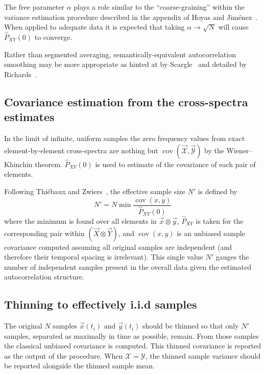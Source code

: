 \documentclass[letterpaper,11pt,nointlimits,reqno]{amsart}
\DeclareMathOperator{\cov}{cov}
\begin{document}
The free parameter $\alpha$ plays a role similar to the ``coarse-graining''
within the variance estimation procedure described in the appendix of Hoyas and
Jim\'{e}nez~\cite{Hoyas2008Reynolds}.  When applied to adequate data it is
expected that taking $\alpha\to\sqrt{N}$ will cause $\hat{P}_{XY}(0)$ to
converge.

Rather than segmented averaging, semantically-equivalent autocorrelation
smoothing may be more appropriate as hinted at by
Scargle~\cite{Scargle1982Studies} and detailed by
Richards~\cite{Richards1967Computing}.

\subsection*{Covariance estimation from the cross-spectra estimates}

In the limit of infinite, uniform samples the zero frequency values from exact
element-by-element cross-spectra are nothing but $\cov\left( \vec{\mathscr{X}}
, \vec{\mathscr{Y}} \right)$ by the Wiener--Khinchin theorem.
$\hat{P}_{XY}(0)$ is used to estimate of the covariance of each pair of
elements.

Following Thi\'{e}baux and Zwiers~\cite{Thiebaux1984Interpretation},
the effective sample size $N'$ is defined by
$$
    N' = N \min \frac{\cov(x,y)} {\hat{P}_{XY}(0)}
$$
where the minimum is found over all elements in $\vec{x}\otimes\vec{y}$,
$\hat{P}_{XY}$ is taken for the corresponding pair within $\left(\vec{X}
\otimes \vec{Y} \right)$, and $\cov(x,y)$ is an unbiased sample covariance
computed assuming all original samples are independent (and therefore their
temporal spacing is irrelevant).  This single value $N'$ gauges the number of
independent samples present in the overall data given the estimated
autocorrelation structure.

\subsection*{Thinning to effectively i.i.d samples}

The original $N$ samples $\vec{x}(t_i)$ and $\vec{y}(t_i)$ should be thinned so
that only $N'$ samples, separated as maximally in time as possible, remain.
From those samples the classical unbiased covariance is computed.  This thinned
covariance is reported as the output of the procedure.  When
$\mathscr{X}=\mathscr{Y}$, the thinned sample variance should be reported
alongside the thinned sample mean.
\end{document}

